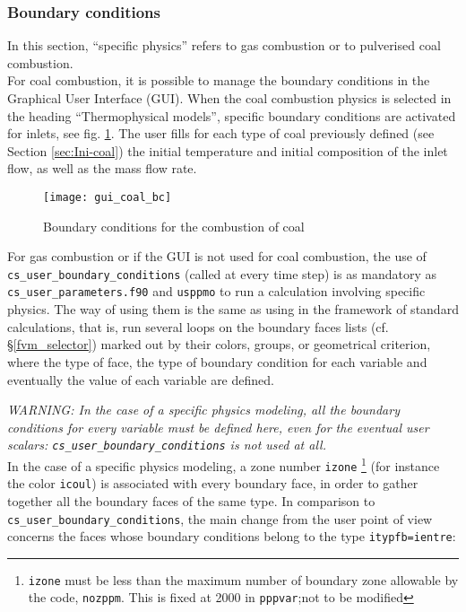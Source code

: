 {{%
\subsubsection{Boundary conditions}\label{sec:coal-cl}
In this section, ``specific physics'' refers to gas combustion or
to pulverised coal combustion.\\
For coal combustion, it is possible to manage the boundary conditions in the Graphical User Interface (GUI). When the coal combustion physics is selected in the heading ``Thermophysical models'', specific boundary conditions are activated for inlets, see fig. \ref{fig:cond_lim-coal}. The user fills for each type of coal previously defined (see Section \ref{sec:Ini-coal}) the initial temperature and initial composition of the inlet flow, as well as the mass flow rate.

\begin{figure}[!ht]
\begin{center}
\texttt{[image: gui\_coal\_bc]}
\caption{Boundary conditions for the combustion of coal}
\label{fig:cond_lim-coal}
\end{center}
\end{figure}

For gas combustion or if the GUI is not used for coal combustion, the use of
\texttt{cs\_user\_boundary\_conditions} (called at every time step) is as
mandatory as \texttt{cs\_user\_parameters.f90} and \texttt{usppmo} to run a calculation involving specific physics. The way of using them is the same as using
 in the framework of standard calculations, that is, run several loops on the boundary faces lists (cf. \S\ref{fvm_selector})
marked out by their colors, groups, or  geometrical criterion, where
the type of face, the type of boundary condition for each variable and
eventually the value of each variable are defined.

{\em WARNING: In the case of a specific physics modeling, all the
boundary conditions for every variable must be defined here, even for
the eventual user scalars: {\em \texttt{cs\_user\_boundary\_conditions}} is not used at all.}\\

In the case of a specific physics modeling, a zone number \texttt{izone}
\footnote{\texttt{izone} must be less than the maximum number of boundary
zone allowable by the code, \texttt{nozppm}. This is fixed at 2000 in
 \texttt{pppvar};not to be modified} (for
instance the color \texttt{icoul}) is associated with every boundary face, in
order to gather together all the boundary faces of the same type. In
comparison to \texttt{cs\_user\_boundary\_conditions}, the main change from the user point of
view concerns the faces whose boundary conditions belong to the type
\texttt{itypfb=ientre}:

}}
